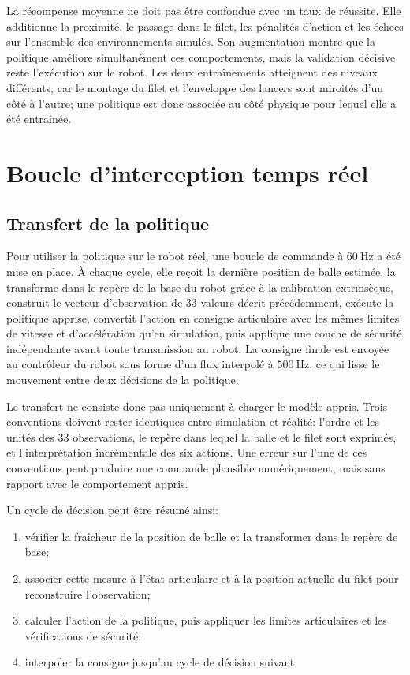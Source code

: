 \documentclass[a4paper,11pt]{report}
\begin{document}
La récompense moyenne ne doit pas être confondue avec un taux de réussite. Elle
additionne la proximité, le passage dans le filet, les pénalités d'action et les
échecs sur l'ensemble des environnements simulés. Son augmentation montre que
la politique améliore simultanément ces comportements, mais la validation
décisive reste l'exécution sur le robot. Les deux entraînements atteignent des
niveaux différents, car le montage du filet et l'enveloppe des lancers sont
miroités d'un côté à l'autre; une politique est donc associée au côté physique
pour lequel elle a été entraînée.

\section{Boucle d'interception temps réel}

\subsection{Transfert de la politique}

Pour utiliser la politique sur le robot réel, une boucle de commande à \(60~\text{Hz}\) a été mise en place. À chaque cycle, elle reçoit la dernière position de balle estimée, la transforme dans le repère de la base du robot grâce à la calibration extrinsèque, construit le vecteur d'observation de \(33\) valeurs décrit précédemment, exécute la politique apprise, convertit l'action en consigne articulaire avec les mêmes limites de vitesse et d'accélération qu'en simulation, puis applique une couche de sécurité indépendante avant toute transmission au robot. La consigne finale est envoyée au contrôleur du robot sous forme d'un flux interpolé à \(500~\text{Hz}\), ce qui lisse le mouvement entre deux décisions de la politique.

Le transfert ne consiste donc pas uniquement à charger le modèle appris. Trois
conventions doivent rester identiques entre simulation et réalité: l'ordre et
les unités des \(33\) observations, le repère dans lequel la balle et le filet
sont exprimés, et l'interprétation incrémentale des six actions. Une erreur sur
l'une de ces conventions peut produire une commande plausible numériquement,
mais sans rapport avec le comportement appris.

Un cycle de décision peut être résumé ainsi:
\begin{enumerate}
  \item vérifier la fraîcheur de la position de balle et la transformer dans le
  repère de base;
  \item associer cette mesure à l'état articulaire et à la position actuelle du
  filet pour reconstruire l'observation;
  \item calculer l'action de la politique, puis appliquer les limites
  articulaires et les vérifications de sécurité;
  \item interpoler la consigne jusqu'au cycle de décision suivant.
\end{enumerate}
\end{document}
